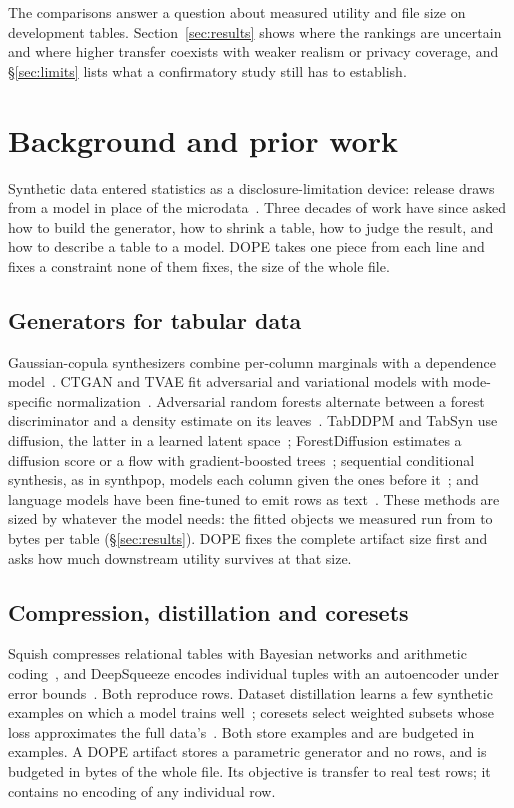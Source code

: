 \documentclass[10pt,letterpaper,twocolumn]{article}
\newcommand{\cli}[1]{{\ttfamily\fontsize{8.9}{11}\selectfont #1}}
\begin{document}
The comparisons answer a question about measured utility and file size on development tables. Section~\ref{sec:results} shows where the rankings are uncertain and where higher transfer coexists with weaker realism or privacy coverage, and \S\ref{sec:limits} lists what a confirmatory study still has to establish.
\section{Background and prior work}\label{sec:related}
Synthetic data entered statistics as a disclosure-limitation device: release draws from a model in place of the microdata~\cite{rubin1993}. Three decades of work have since asked how to build the generator, how to shrink a table, how to judge the result, and how to describe a table to a model. DOPE takes one piece from each line and fixes a constraint none of them fixes, the size of the whole file.

\subsection{Generators for tabular data}
Gaussian-copula synthesizers combine per-column marginals with a dependence model~\cite{sklar1959fonctions,patki2016sdv}. CTGAN and TVAE fit adversarial and variational models with mode-specific normalization~\cite{xu2019ctgan}. Adversarial random forests alternate between a forest discriminator and a density estimate on its leaves~\cite{watson2023arf}. TabDDPM and TabSyn use diffusion, the latter in a learned latent space~\cite{kotelnikov2023tabddpm,zhang2024tabsyn}; ForestDiffusion estimates a diffusion score or a flow with gradient-boosted trees~\cite{jolicoeur2024forest}; sequential conditional synthesis, as in \cli{synthpop}, models each column given the ones before it~\cite{nowok2016synthpop}; and language models have been fine-tuned to emit rows as text~\cite{borisov2023great}. These methods are sized by whatever the model needs: the fitted objects we measured run from  to  bytes per table (\S\ref{sec:results}). DOPE fixes the complete artifact size first and asks how much downstream utility survives at that size.

\subsection{Compression, distillation and coresets}
Squish compresses relational tables with Bayesian networks and arithmetic coding~\cite{gao2016squish}, and DeepSqueeze encodes individual tuples with an autoencoder under error bounds~\cite{ilkhechi2020deepsqueeze}. Both reproduce rows. Dataset distillation learns a few synthetic examples on which a model trains well~\cite{wang2018distillation}; coresets select weighted subsets whose loss approximates the full data's~\cite{bachem2017coresets,mirzasoleiman2020craig}. Both store examples and are budgeted in examples. A DOPE artifact stores a parametric generator and no rows, and is budgeted in bytes of the whole file. Its objective is transfer to real test rows; it contains no encoding of any individual row.
\end{document}
